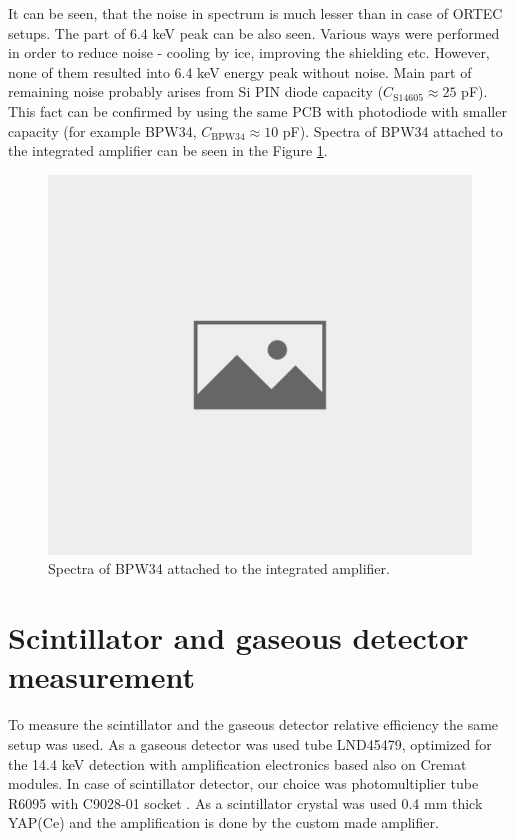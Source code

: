It can be seen, that the noise in spectrum is much lesser than in case of ORTEC setups. The part of 6.4 keV peak can be also seen. Various ways were performed in order to reduce noise - cooling by ice, improving the shielding etc. However, none of them resulted into 6.4 keV energy peak without noise. Main part of remaining noise probably arises from Si PIN diode capacity ($C_{\textrm{S14605}} \approx 25$ pF). This fact can be confirmed by using the same PCB with photodiode with smaller capacity (for example BPW34, $C_{\textrm{BPW34}} \approx 10$ pF). Spectra of BPW34 attached to the integrated amplifier can be seen in the Figure \ref{BPW34 integrated amplifier spectra.}.


\begin{figure}[H]
\centering
\includegraphics[scale=0.125, angle = 0]{./pictures/NoPicture.jpg}
\caption{Spectra of BPW34 attached to the integrated amplifier.}
\label{BPW34 integrated amplifier spectra.}

\end{figure}


\section{Scintillator and gaseous detector measurement}
To measure the scintillator and the gaseous detector relative efficiency the same setup was used. As a gaseous detector was used tube LND45479, optimized for the 14.4 keV detection with amplification electronics based also on Cremat modules. In case of scintillator detector, our choice was photomultiplier tube R6095 \cite{R6095} with C9028-01 socket \cite{C9028}. As a scintillator crystal was used 0.4 mm thick YAP(Ce) and the amplification is done by the custom made amplifier\cite{STEJSKAL2019thesis}.

